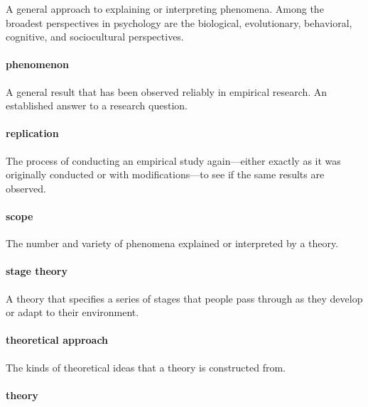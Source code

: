 \documentclass[
]{krantz}
\begin{document}
A general approach to explaining or interpreting phenomena. Among the broadest perspectives in psychology are the biological, evolutionary, behavioral, cognitive, and sociocultural perspectives.

\paragraph*{phenomenon}\label{phenomenon}

A general result that has been observed reliably in empirical research. An established answer to a research question.

\paragraph*{replication}\label{replication}

The process of conducting an empirical study again---either exactly as it was originally conducted or with modifications---to see if the same results are observed.

\paragraph*{scope}\label{scope-1}

The number and variety of phenomena explained or interpreted by a theory.

\paragraph*{stage theory}\label{stage-theory}

A theory that specifies a series of stages that people pass through as they develop or adapt to their environment.

\paragraph*{theoretical approach}\label{theoretical-approach-1}

The kinds of theoretical ideas that a theory is constructed from.

\paragraph*{theory}\label{theory}
\end{document}
